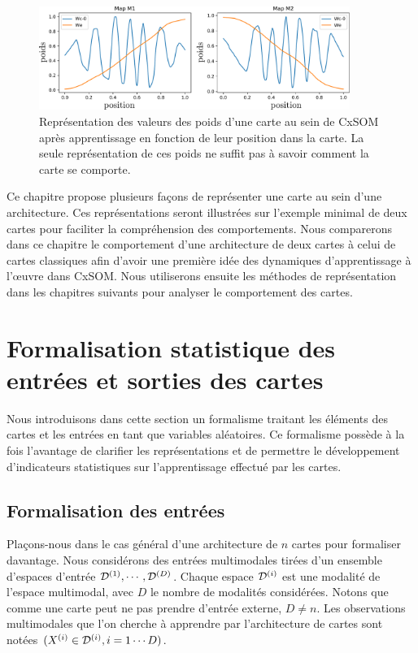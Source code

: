 \documentclass[../main]{subfiles}
\begin{document}
\begin{figure}
\centering
\includegraphics[width=0.9\textwidth]{weights_cercle1.pdf}

\caption{Représentation des valeurs des poids d'une carte au sein de CxSOM après apprentissage en fonction de leur position dans la carte. La seule représentation de ces poids ne suffit pas à savoir comment la carte se comporte.\label{fig:weights}}
\end{figure}

Ce chapitre propose plusieurs façons de représenter une carte au sein d'une architecture.
Ces représentations seront illustrées sur l'exemple minimal de deux cartes pour faciliter la compréhension des comportements. Nous comparerons dans ce chapitre le comportement d'une architecture de deux cartes à celui de cartes classiques afin d'avoir une première idée des dynamiques d'apprentissage à l'\oe{}uvre dans CxSOM.
Nous utiliserons ensuite les méthodes de représentation dans les chapitres suivants pour analyser le comportement des cartes.

\section{Formalisation statistique des entrées et sorties des cartes}

Nous introduisons dans cette section un formalisme traitant les éléments des cartes et les entrées en tant que variables aléatoires. 
Ce formalisme possède à la fois l'avantage de clarifier les représentations et de permettre le développement d'indicateurs statistiques sur l'apprentissage effectué par les cartes.

\subsection{Formalisation des entrées}

Plaçons-nous dans le cas général d'une architecture de $n$ cartes pour formaliser davantage.
Nous considérons des entrées multimodales tirées d'un ensemble d'espaces d'entrée $\mathcal{D}^{({1})},\cdots,\mathcal{D}^{({D})}$. Chaque espace $\mathcal{D}^{({i})}$ est une modalité de l'espace multimodal, avec $D$ le nombre de modalités considérées. Notons que comme une carte peut ne pas prendre d'entrée externe, $D \neq n$.
Les observations multimodales que l'on cherche à apprendre par l'architecture de cartes sont notées $(X^{({i})} \in \mathcal{D}^{({i})}, i = 1 \cdots D)$.
\end{document}
